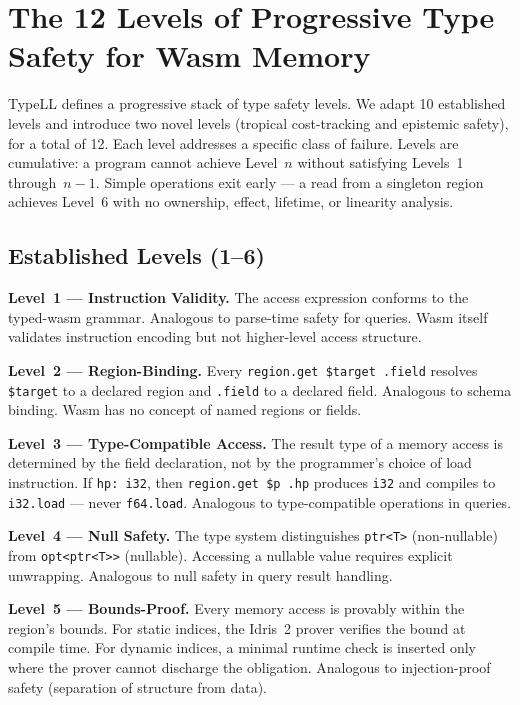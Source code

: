 \documentclass[sigplan,nonacm,screen]{acmart}
\begin{document}
\section{The 12 Levels of Progressive Type Safety for Wasm Memory}
\label{sec:levels}

TypeLL defines a progressive stack of type safety levels. We adapt 10
established levels and introduce two novel levels (tropical cost-tracking
and epistemic safety), for a total of 12. Each level addresses a specific
class of failure. Levels are cumulative: a program cannot achieve Level~$n$
without satisfying Levels~1 through~$n{-}1$. Simple operations exit early
--- a read from a singleton region achieves Level~6 with no ownership,
effect, lifetime, or linearity analysis.

\subsection{Established Levels (1--6)}

\textbf{Level~1 --- Instruction Validity.}
The access expression conforms to the typed-wasm grammar. Analogous to
parse-time safety for queries. Wasm itself validates instruction encoding
but not higher-level access structure.

\textbf{Level~2 --- Region-Binding.}
Every \texttt{region.get \$target .field} resolves \texttt{\$target} to a
declared region and \texttt{.field} to a declared field. Analogous to
schema binding. Wasm has no concept of named regions or fields.

\textbf{Level~3 --- Type-Compatible Access.}
The result type of a memory access is determined by the field declaration,
not by the programmer's choice of load instruction. If \texttt{hp: i32},
then \texttt{region.get \$p .hp} produces \texttt{i32} and compiles to
\texttt{i32.load} --- never \texttt{f64.load}. Analogous to type-compatible
operations in queries.

\textbf{Level~4 --- Null Safety.}
The type system distinguishes \texttt{ptr<T>} (non-nullable) from
\texttt{opt<ptr<T>{}>} (nullable). Accessing a nullable value requires
explicit unwrapping. Analogous to null safety in query result handling.

\textbf{Level~5 --- Bounds-Proof.}
Every memory access is provably within the region's bounds. For static
indices, the Idris~2 prover verifies the bound at compile time. For
dynamic indices, a minimal runtime check is inserted only where the prover
cannot discharge the obligation. Analogous to injection-proof safety
(separation of structure from data).
\end{document}
